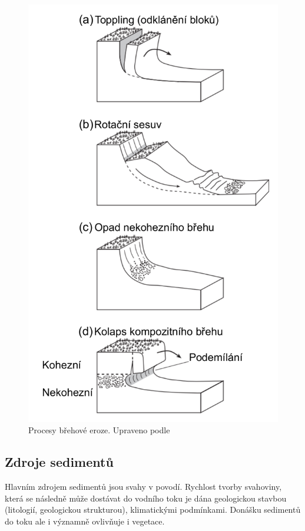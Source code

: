 \begin{figure}
	\centering
	\includegraphics[width=1\linewidth]{obrazky/fluvial/bank_erosion}
	\caption{Procesy břehové eroze. Upraveno podle \textcite{charltonFundamentalsFluvialGeomorphology2007}}
	\label{fig:bankerosion}
\end{figure}

\subsection{Zdroje sedimentů}
Hlavním zdrojem sedimentů jsou svahy v povodí. Rychlost tvorby svahoviny, která se následně může dostávat do vodního toku je dána geologickou stavbou (litologií, geologickou strukturou), klimatickými podmínkami. Donášku sedimentů do toku ale i významně ovlivňuje i vegetace. 

